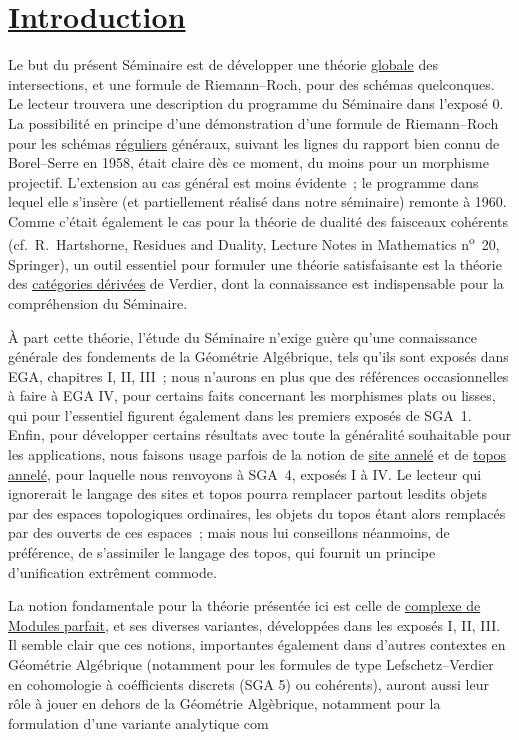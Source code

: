 \section*{\underline{Introduction}}
Le but du présent Séminaire est de développer une théorie \underline{globale} des intersections, et une formule de Riemann--Roch, pour des schémas quelconques. Le lecteur trouvera une description du programme du Séminaire dans l'exposé 0. La possibilité en principe d'une démonstration d'une formule de Riemann--Roch pour les schémas \underline{réguliers} généraux, suivant les lignes du rapport bien connu de Borel--Serre en 1958, était claire dès ce moment, du moins pour un morphisme projectif. L'extension au cas général est moins évidente~; le programme dans lequel elle s'insère (et partiellement réalisé dans notre séminaire) remonte à 1960. Comme c'était également le cas pour la théorie de dualité des faisceaux cohérents (cf.\ R.~Hartshorne, Residues and Duality, Lecture Notes in Mathematics n\textsuperscript{o}~20, Springer), un outil essentiel pour formuler une théorie satisfaisante est la théorie des \underline{catégories dérivées} de Verdier, dont la connaissance est indispensable pour la compréhension du Séminaire.

À part cette théorie, l'étude du Séminaire n'exige guère qu'une connaissance générale des fondements de la Géométrie Algébrique, tels qu'ils sont exposés dans EGA, chapitres I, II, III~; nous n'aurons en plus que des références occasionnelles à faire à EGA IV, pour certains faits concernant les morphismes plats ou lisses, qui pour l'essentiel figurent également dans les premiers exposés de SGA~1. Enfin, pour développer certains résultats avec toute la généralité souhaitable pour les applications, nous faisons usage parfois de la notion de \underline{site annelé} et de \underline{topos annelé}, pour laquelle nous renvoyons à SGA~4, exposés I à IV. Le lecteur qui ignorerait le langage des sites et topos pourra remplacer partout lesdits objets par des espaces topologiques ordinaires, les objets du topos étant alors remplacés par des ouverts de ces espaces~; mais nous lui conseillons néanmoins, de préférence, de s'assimiler le langage des topos, qui fournit un principe d'unification extrêment commode.

La notion fondamentale pour la théorie présentée ici est celle de \underline{complexe de Modules parfait}, et ses diverses variantes, développées dans les exposés I, II, III. Il semble clair que ces notions, importantes également dans d'autres contextes en Géométrie Algébrique (notamment pour les formules de type Lefschetz--Verdier en cohomologie à coéfficients discrets (SGA 5) ou cohérents), auront aussi leur rôle à jouer en dehors de la Géométrie Algèbrique, notamment pour la formulation d'une variante analytique com%
